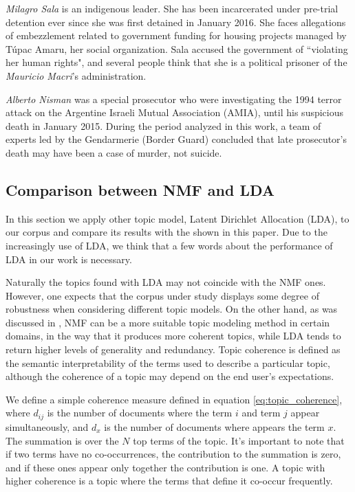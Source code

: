 \documentclass{bmcart}
\begin{document}
\par \emph{Milagro Sala} is an indigenous leader. 
She has been incarcerated under pre-trial detention ever since she was first detained in January 2016. She faces allegations of embezzlement related to government funding for housing projects managed by T\'upac Amaru, her social organization.
Sala accused the government of ``violating her human rights", and several people think that she is a political prisoner of the \emph{Mauricio Macri}'s administration.

\par \emph{Alberto Nisman} was a special prosecutor who were investigating the 1994 terror attack on the Argentine Israeli Mutual Association (AMIA), until his suspicious death in January 2015.
During the period analyzed in this work, a team of experts led by the Gendarmerie (Border Guard) concluded that late prosecutor's death may have been a case of murder, not suicide.


\subsection*{Comparison between NMF and LDA}

\par In this section we apply other topic model, Latent Dirichlet Allocation \cite{blei2003latent} (LDA), to our corpus and compare its results with the shown in this paper. Due to the increasingly use of LDA, we think that a few words about the performance of LDA in our work is necessary. 

\par Naturally the topics found with LDA may not coincide with the NMF ones.
However, one expects that the corpus under study displays some degree of  robustness  when considering different topic models.
On the other hand, as was discussed in \cite{o2015analysis}, NMF can be a more suitable topic modeling method in certain domains, in the way that it produces more coherent topics, while LDA tends to return higher levels of generality and redundancy. Topic coherence is defined as the semantic interpretability of the terms used to describe a particular topic, although the coherence of a topic may depend on the end user's expectations.

\par We define a simple coherence measure defined in equation \ref{eq:topic_coherence}, where $d_{ij}$ is the number of documents where the term $i$ and term $j$ appear simultaneously, and $d_{x}$ is the number of documents where appears the term $x$. The summation is over the $N$ top terms of the topic.
It's important to note that if two terms have no co-occurrences, the contribution to the summation is zero, and if these ones appear only together the contribution is one.
A topic with higher coherence is a topic where the terms that define it co-occur frequently.
\end{document}
